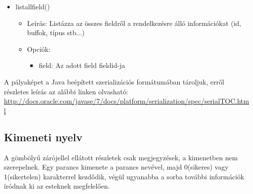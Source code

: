 \begin{itemize}
    \item listallfield()
    \begin{itemize}
    	\item Leírás: Listázza az összes fieldről a rendelkezésre álló információkat (id, buffok, típus stb...)
    	\item Opciók: 
    	\begin{itemize}
    		\item field: Az adott field fieldid-ja
    	\end{itemize}	
    \end{itemize}        
    
    

\end{itemize}

\noindent A pályaképet a Java beépített szerializációs formátumában tároljuk, erről részletes leírás az alábbi linken olvasható:\\
\url{http://docs.oracle.com/javase/7/docs/platform/serialization/spec/serialTOC.html}

\subsection{Kimeneti nyelv}

A gömbölyű zárójellel ellátott részletek csak megjegyzések, a kimenetben nem szerepelnek. \newline
Egy parancs kimenete a parancs nevével, majd 0(sikeres) vagy 1(sikertelen) karakterrel kezdődik, végül ugyanabba a sorba további információk íródnak ki az esteknek megfelelően.

